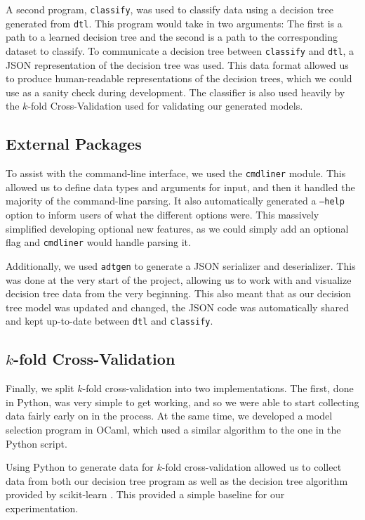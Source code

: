 \documentclass[screen, authorversion, nonacm, sigconf]{acmart}
\begin{document}
A second program, \texttt{classify}, was used to classify data using a decision tree generated from \texttt{dtl}. This program would take in two arguments: The first is a path to a learned decision tree and the second is a path to the corresponding dataset to classify. To communicate a decision tree between \texttt{classify} and \texttt{dtl}, a JSON representation of the decision tree was used. This data format allowed us to produce human-readable representations of the decision trees, which we could use as a sanity check during development. The classifier is also used heavily by the $k$-fold Cross-Validation used for validating our generated models.

\subsection{External Packages}

To assist with the command-line interface, we used the \texttt{cmdliner} module. This allowed us to define data types and arguments for input, and then it handled the majority of the command-line parsing. It also automatically generated a \texttt{--help} option to inform users of what the different options were. This massively simplified developing optional new features, as we could simply add an optional flag and \texttt{cmdliner} would handle parsing it.

Additionally, we used \texttt{adtgen} to generate a JSON serializer and deserializer. This was done at the very start of the project, allowing us to work with and visualize decision tree data from the very beginning. This also meant that as our decision tree model was updated and changed, the JSON code was automatically shared and kept up-to-date between \texttt{dtl} and \texttt{classify}.

\subsection{$k$-fold Cross-Validation}

Finally, we split $k$-fold cross-validation into two implementations. The first, done in Python, was very simple to get working, and so we were able to start collecting data fairly early on in the process. At the same time, we developed a model selection program in OCaml, which used a similar algorithm to the one in the Python script.

Using Python to generate data for $k$-fold cross-validation allowed us to collect data from both our decision tree program as well as the decision tree algorithm provided by scikit-learn \cite{scikit-learn}. This provided a simple baseline for our experimentation.
\end{document}

